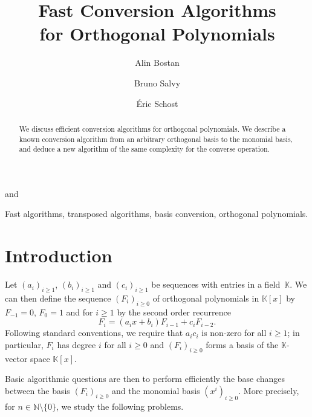 \documentclass{elsart}
\def\K {\ensuremath{\mathbb{K}}}
\begin{document}
\begin{frontmatter}
\title{Fast Conversion Algorithms \\ for Orthogonal Polynomials}
\author{Alin Bostan} 
 \qquad
\author{Bruno Salvy} 
\address{Algorithms Project, INRIA Rocquencourt \\ 78153 Le Chesnay Cedex France} \medskip
and
\author{{\'E}ric Schost} 
\address{ORCCA and Computer Science Department, Middlesex College, \\
University of Western Ontario, London, Canada}


\begin{abstract}
We discuss efficient conversion algorithms for orthogonal polynomials. We describe a known 
conversion algorithm from an arbitrary orthogonal basis to the monomial basis,
and deduce a new algorithm of the same complexity for the converse operation.
\end{abstract}


\begin{keyword}
Fast algorithms, transposed algorithms, basis conversion, orthogonal polynomials.
\end{keyword}


\maketitle 
\end{frontmatter}



\section{Introduction}

Let $(a_i)_{i \ge 1}$, $(b_i)_{i \ge 1}$ and $(c_i)_{i \ge 1}$ be
sequences with entries in a field~$\K$. We can then define the
sequence $(F_i)_{i \geq 0}$ of orthogonal polynomials in $\K[x]$ by
$F_{-1} = 0$, $F_0 = 1$ and for $i \ge 1$ by the second order
recurrence
\begin{equation}\label{eq:1}
F_{i} = (a_{i} x+b_{i}) F_{i-1} + c_{i} F_{i-2}.
\end{equation}
Following standard conventions, we require that $a_i c_i$ is non-zero
for all $i \geq 1$; in particular, $F_i$ has degree $i$ for all $i\geq
0$ and $(F_i)_{i \geq 0}$ forms a basis of the $\K$-vector space
$\K[x]$.

Basic algorithmic questions are then to perform efficiently the base
changes between the basis $(F_i)_{i \geq 0}$ and the monomial basis
$(x^i)_{i \geq 0}$. More precisely, for $n \in \mathbb{N}\setminus
\{0\}$, we study the following problems.
\end{document}
